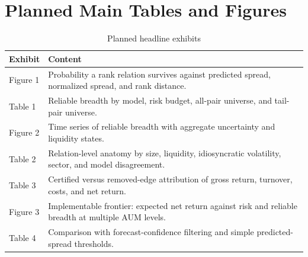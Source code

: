 \section{Planned Main Tables and Figures}

\begin{table}[H]
\centering
\caption{Planned headline exhibits}
\begin{tabularx}{\textwidth}{@{}p{}X@{}}
\toprule
Exhibit & Content \\
\midrule
Figure 1 & Probability a rank relation survives against predicted spread, normalized spread, and rank distance. \\
Table 1 & Reliable breadth by model, risk budget, all-pair universe, and tail-pair universe. \\
Figure 2 & Time series of reliable breadth with aggregate uncertainty and liquidity states. \\
Table 2 & Relation-level anatomy by size, liquidity, idiosyncratic volatility, sector, and model disagreement. \\
Table 3 & Certified versus removed-edge attribution of gross return, turnover, costs, and net return. \\
Figure 3 & Implementable frontier: expected net return against risk and reliable breadth at multiple AUM levels. \\
Table 4 & Comparison with forecast-confidence filtering and simple predicted-spread thresholds. \\
\bottomrule
\end{tabularx}
\end{table}
